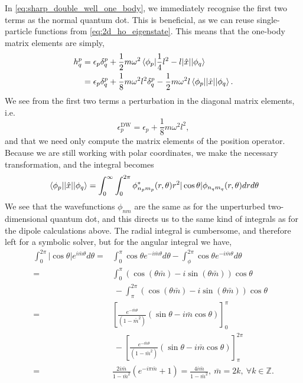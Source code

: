 In \autoref{eq:sharp_double_well_one_body}, we immediately recognise 
the first two terms as the normal quantum dot. This is beneficial, as we 
can reuse single-particle functions from \autoref{eq:2d_ho_eigenstate}.
This means that the one-body matrix elements are simply,
\begin{equation}
    \begin{aligned}
    h^p_q &= \epsilon_p\delta^p_q + \frac{1}{2}m\omega^2
        \mel{\phi_p}{\frac{1}{4}l^2 - l |\hat{x}|}{\phi_q} \\ 
    &= \epsilon_p\delta^p_q + \frac{1}{8}m \omega^2l^2\delta^p_q 
        - \frac{1}{2} m \omega^2l \mel{\phi_p}{|\hat{x}|}{\phi_q}.
    \end{aligned}
\end{equation}
We see from the first two terms a perturbation in the diagonal matrix 
elements, i.e. 
\begin{equation}
    \epsilon_p^{\text{DW}} = \epsilon_p + \frac{1}{8}m\omega^2l^2,
\end{equation}
and that we need only compute the matrix elements of the position operator.
Because we are still working with polar coordinates, we make the necessary 
transformation, and the integral becomes
\begin{equation}
    \mel{\phi_p}{|\hat{x}|}{\phi_q} 
    = \int_0^\infty \int_0^{2\pi} 
        \phi_{n_pm_p}^*(r,\theta) r^2 |\cos\theta| \phi_{n_qm_q}(r,\theta)
    drd\theta
\end{equation}
We see that the wavefunctions $\phi_{nm}$ are the same as for the unperturbed 
two-dimensional quantum dot, and this directs us to the same kind of integrals 
as for the dipole calculations above. The radial integral is cumbersome, and
therefore left for a symbolic solver, but for the angular integral we have, 
\begin{equation}
    \begin{aligned}
    \int_0^{2\pi} |\cos\theta| e^{i\bar{m}\theta} d\theta
    =& \int_0^\pi \cos\theta e^{-i\bar{m}\theta} d\theta
        - \int_\phi^{2\pi} \cos\theta e^{-i\bar{m}\theta} d\theta \\
    =& \int_0^\pi \left(\cos(\theta\bar{m}) - i\sin(\theta\bar{m})\right)\cos\theta \\
    &\ -
    \int_\pi^{2\pi} \left(\cos(\theta\bar{m}) - i\sin(\theta\bar{m})\right)\cos\theta \\
    =& \left[\frac{e^{-\bar{m}\theta}}{(1 - \bar{m}^2)} 
        \left(\sin\theta -i\bar{m}\cos\theta\right)\right]_0^\pi \\
    &\ -
    \left[\frac{e^{-\bar{m}\theta}}{(1 - \bar{m}^2)} 
        \left(\sin\theta -i\bar{m}\cos\theta\right)\right]_\pi^{2\pi} \\
    =&
    \frac{2i\bar{m}}{1 - \bar{m}^2} (e^{-i\pi\bar{m}} + 1)
    = \frac{4i\bar{m}}{1 - \bar{m}^2}, \ \bar{m} = 2k, \ \forall k\in\mathbb{Z}.
    \end{aligned}
\end{equation}
